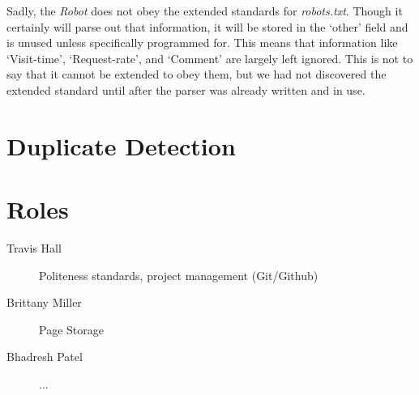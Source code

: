 \documentclass[letterpaper,11pt,twoside]{article}
\begin{document}
Sadly, the \emph{Robot} does not obey the extended standards for \emph{robots.txt}. Though it certainly will parse out that information, it will be stored in the `other' field and is unused unless specifically programmed for. This means that information like `Visit-time', `Request-rate', and `Comment' are largely left ignored. This is not to say that it cannot be extended to obey them, but we had not discovered the extended standard until after the parser was already written and in use.

\section{Duplicate Detection}

\section{Roles}

\begin{description}
 \item[Travis Hall] Politeness standards, project management (Git/Github)
 \item[Brittany Miller] Page Storage 
 \item[Bhadresh Patel] ...
\end{description}
\end{document}
